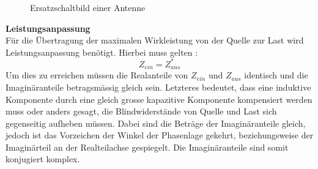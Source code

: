 

\begin{figure}[!ht]
	\begin{center}
	\end{center}
\caption{Ersatzschaltbild einer Antenne}
\label{fig:ESBantenne}
\end{figure}


\textbf{Leistungsanpassung } \\
Für die Übertragung der maximalen Wirkleistung von der Quelle zur Last wird Leistungsanpassung benötigt. Hierbei muss gelten \cite{Tekom}:
\[Z_{ein} = Z_{aus}^*\]
Um dies zu erreichen müssen die Realanteile von $Z_{ein}$ und $Z_{aus}$ identisch und die Imaginäranteile betragsmässig gleich sein. Letzteres bedeutet, dass eine induktive Komponente durch eine gleich grosse kapazitive Komponente kompensiert werden muss oder anders gesagt, die Blindwiderstände von Quelle und Last sich gegenseitig aufheben müssen. Dabei sind die Beträge der Imaginäranteile gleich, jedoch ist das Vorzeichen der Winkel der Phasenlage gekehrt, beziehungsweise der Imaginärteil an der Realteilachse gespiegelt. Die Imaginäranteile sind somit konjugiert komplex.\\

